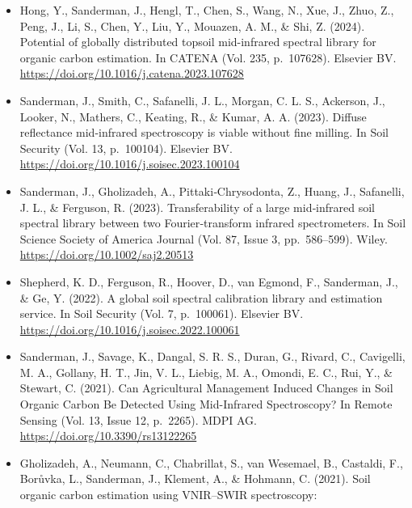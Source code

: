 \documentclass[
  letterpaper,
  DIV=11,
  numbers=noendperiod]{scrreprt}
\begin{document}
\begin{itemize}
  L. L., Hengl, T., Adam, S., Albinet, F., Ben-Dor, E., Boot, C. M.,
  Bridson, J. H., Chabrillat, S., Deiss, L., Demattê, J. A. M., Scott
  Demyan, M., Dercon, G., Doetterl, S., van Egmond, F., Ferguson, R.,
  \ldots{} Żelazny, W. R. (2023). An interlaboratory comparison of
  mid-infrared spectra acquisition: Instruments and procedures matter.
  In Geoderma (Vol. 440, p.~116724). Elsevier BV.
  \url{https://doi.org/10.1016/j.geoderma.2023.116724}
\item
  Hong, Y., Sanderman, J., Hengl, T., Chen, S., Wang, N., Xue, J., Zhuo,
  Z., Peng, J., Li, S., Chen, Y., Liu, Y., Mouazen, A. M., \& Shi, Z.
  (2024). Potential of globally distributed topsoil mid-infrared
  spectral library for organic carbon estimation. In CATENA (Vol. 235,
  p.~107628). Elsevier BV.
  \url{https://doi.org/10.1016/j.catena.2023.107628}
\item
  Sanderman, J., Smith, C., Safanelli, J. L., Morgan, C. L. S.,
  Ackerson, J., Looker, N., Mathers, C., Keating, R., \& Kumar, A. A.
  (2023). Diffuse reflectance mid-infrared spectroscopy is viable
  without fine milling. In Soil Security (Vol. 13, p.~100104). Elsevier
  BV. \url{https://doi.org/10.1016/j.soisec.2023.100104}
\item
  Sanderman, J., Gholizadeh, A., Pittaki‐Chrysodonta, Z., Huang, J.,
  Safanelli, J. L., \& Ferguson, R. (2023). Transferability of a large
  mid‐infrared soil spectral library between two Fourier‐transform
  infrared spectrometers. In Soil Science Society of America Journal
  (Vol. 87, Issue 3, pp.~586--599). Wiley.
  \url{https://doi.org/10.1002/saj2.20513}
\item
  Shepherd, K. D., Ferguson, R., Hoover, D., van Egmond, F., Sanderman,
  J., \& Ge, Y. (2022). A global soil spectral calibration library and
  estimation service. In Soil Security (Vol. 7, p.~100061). Elsevier BV.
  \url{https://doi.org/10.1016/j.soisec.2022.100061}
\item
  Sanderman, J., Savage, K., Dangal, S. R. S., Duran, G., Rivard, C.,
  Cavigelli, M. A., Gollany, H. T., Jin, V. L., Liebig, M. A., Omondi,
  E. C., Rui, Y., \& Stewart, C. (2021). Can Agricultural Management
  Induced Changes in Soil Organic Carbon Be Detected Using Mid-Infrared
  Spectroscopy? In Remote Sensing (Vol. 13, Issue 12, p.~2265). MDPI AG.
  \url{https://doi.org/10.3390/rs13122265}
\item
  Gholizadeh, A., Neumann, C., Chabrillat, S., van Wesemael, B.,
  Castaldi, F., Borůvka, L., Sanderman, J., Klement, A., \& Hohmann, C.
  (2021). Soil organic carbon estimation using VNIR--SWIR spectroscopy:

\end{itemize}
\end{document}

